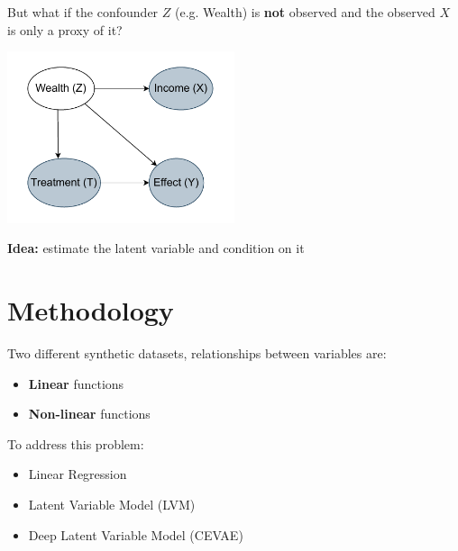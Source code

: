 \documentclass[10pt]{beamer}
\begin{document}
\begin{frame}{}
But what if the confounder $Z$ (e.g. Wealth) is \textbf{not} observed and the observed $X$ is only a proxy of it?
    \begin{center}
  \includegraphics[width=0.5\textwidth]{images/latent_confounder.pdf}
\end{center}
  
\textbf{Idea:} estimate the latent variable and condition on it


 \end{frame}

  \section{Methodology}

 \begin{frame}{}
Two different synthetic datasets, relationships between variables are:
\begin{itemize}
  \item \textbf{Linear} functions
  \item \textbf{Non-linear} functions
\end{itemize}

To address this problem:
\begin{itemize}
  \item Linear Regression 
  \item  Latent Variable Model (LVM)
  \item Deep Latent Variable Model (CEVAE)
\end{itemize}

 \end{frame}
\end{document}
